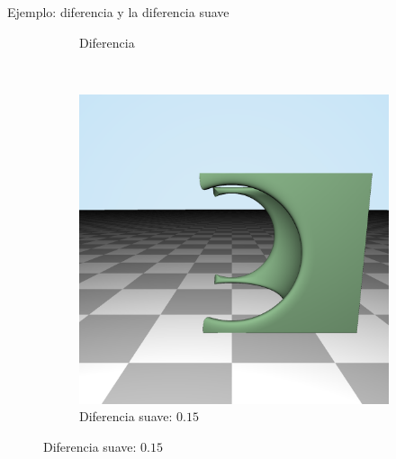 \begin{frame}[fragile]{Ejemplo: diferencia y la diferencia suave}
\begin{figure}[htp]
\begin{subfigure}[b]{0.2\textwidth}
   \caption{Diferencia}
 \end{subfigure}
~
 \begin{subfigure}[b]{0.2\textwidth}
   \includegraphics[width=\textwidth]{img/SmoothSubstraction}
   \caption{Diferencia suave: $0.15$}
 \end{subfigure}
\end{figure}
\end{frame}


